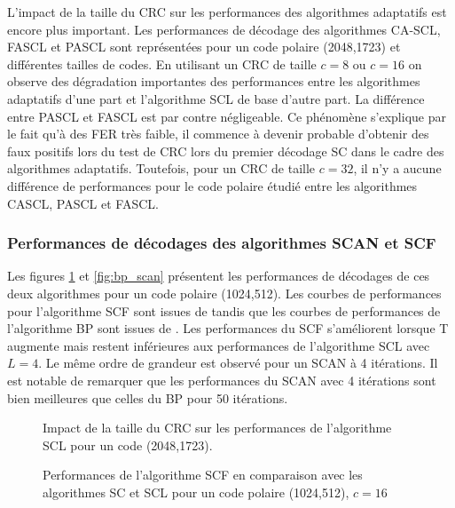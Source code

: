 L'impact de la taille du CRC sur les performances des algorithmes adaptatifs est encore plus important. Les performances de décodage des algorithmes CA-SCL, FASCL et PASCL sont représentées pour un code polaire (2048,1723) et différentes tailles de codes. En utilisant un CRC de taille $c=8$ ou $c=16$ on observe des dégradation importantes des performances entre les algorithmes adaptatifs d'une part et l'algorithme SCL de base d'autre part. La différence entre PASCL et FASCL est par contre négligeable. Ce phénomène s'explique par le fait qu'à des FER très faible, il commence à devenir probable d'obtenir des faux positifs lors du test de CRC lors du premier décodage SC dans le cadre des algorithmes adaptatifs. Toutefois, pour un CRC de taille $c=32$, il n'y a aucune différence de performances pour le code polaire étudié entre les algorithmes CASCL, PASCL et FASCL.

\subsubsection{Performances de décodages des algorithmes SCAN et SCF}
Les figures \ref{fig:scf} et \ref{fig:bp_scan} présentent les performances de décodages de ces deux algorithmes pour un code polaire (1024,512). Les courbes de performances pour l'algorithme SCF sont issues de \cite{afisiadis_low-complexity_2014} tandis que les courbes de performances de l'algorithme BP sont issues de \cite{pamuk_fpga_2011}. Les performances du SCF s'améliorent lorsque T augmente mais restent inférieures aux performances de l'algorithme SCL avec $L=4$. Le même ordre de grandeur est observé pour un SCAN à 4 itérations. Il est notable de remarquer que les performances du SCAN avec 4 itérations sont bien meilleures que celles du BP pour 50 itérations. 
\begin{figure}[t]
  \centering
  \caption{Impact de la taille du CRC sur les performances de l'algorithme SCL pour un code (2048,1723).}
\end{figure}


\begin{figure}[h]
  \centering
  
  \caption{Performances de l'algorithme SCF en comparaison avec les algorithmes SC et SCL pour un code polaire (1024,512), $c=16$}
  \label{fig:scf}
\end{figure}

